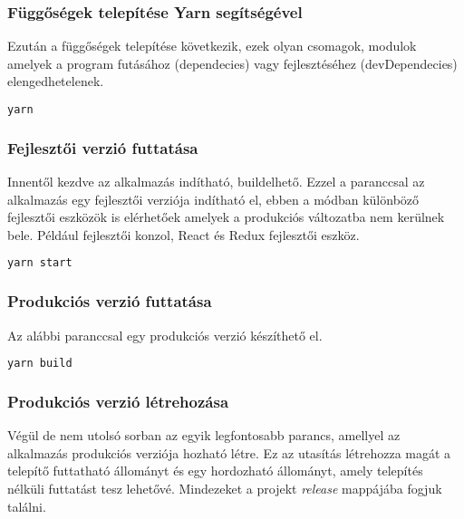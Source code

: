 \subsubsection{Függőségek telepítése Yarn segítségével}
Ezután a függőségek telepítése következik, ezek olyan csomagok, modulok amelyek a program futásához (dependecies) vagy fejlesztéséhez (devDependecies) elengedhetelenek.
\begin{lstlisting}[language={Bash}, numbers={none}]
    yarn
\end{lstlisting}

\subsubsection{Fejlesztői verzió futtatása}
Innentől kezdve az alkalmazás indítható, buildelhető. Ezzel a paranccsal az alkalmazás egy fejlesztői verziója indítható el, ebben a módban különböző fejlesztői eszközök is elérhetőek amelyek a produkciós változatba nem kerülnek bele. Például fejlesztői konzol, React és Redux fejlesztői eszköz.
\begin{lstlisting}[language={Bash}, numbers={none}]
    yarn start
\end{lstlisting}

\subsubsection{Produkciós verzió futtatása}
Az alábbi paranccsal egy produkciós verzió készíthető el.
\begin{lstlisting}[language={Bash}, numbers={none}]
    yarn build
\end{lstlisting}

\subsubsection{Produkciós verzió létrehozása}
Végül de nem utolsó sorban az egyik legfontosabb parancs, amellyel az alkalmazás produkciós verziója hozható létre. Ez az utasítás létrehozza magát a telepítő futtatható állományt és egy hordozható állományt, amely telepítés nélküli futtatást tesz lehetővé. Mindezeket a projekt {\it release} mappájába fogjuk találni.


